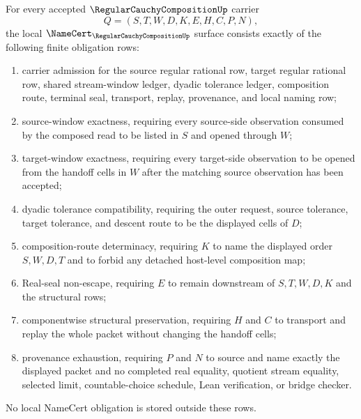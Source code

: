 \begin{theorem}\label{thm:regular-cauchy-composition-namecert-obligations}
For every accepted $\RegularCauchyCompositionUp$ carrier
$$
Q=(S,T,W,D,K,E,H,C,P,N),
$$
the local $\NameCert_{\RegularCauchyCompositionUp}$ surface consists exactly of the following finite obligation rows:
\begin{enumerate}
\item carrier admission for the source regular rational row, target regular rational row, shared stream-window ledger, dyadic tolerance ledger, composition route, terminal seal, transport, replay, provenance, and local naming row;
\item source-window exactness, requiring every source-side observation consumed by the composed read to be listed in $S$ and opened through $W$;
\item target-window exactness, requiring every target-side observation to be opened from the handoff cells in $W$ after the matching source observation has been accepted;
\item dyadic tolerance compatibility, requiring the outer request, source tolerance, target tolerance, and descent route to be the displayed cells of $D$;
\item composition-route determinacy, requiring $K$ to name the displayed order $S,W,D,T$ and to forbid any detached host-level composition map;
\item Real-seal non-escape, requiring $E$ to remain downstream of $S,T,W,D,K$ and the structural rows;
\item componentwise structural preservation, requiring $H$ and $C$ to transport and replay the whole packet without changing the handoff cells;
\item provenance exhaustion, requiring $P$ and $N$ to source and name exactly the displayed packet and no completed real equality, quotient stream equality, selected limit, countable-choice schedule, Lean verification, or bridge checker.
\end{enumerate}
No local NameCert obligation is stored outside these rows.
\end{theorem}
